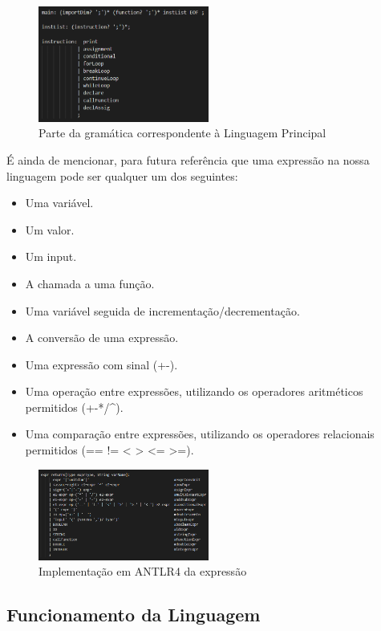 \documentclass[10pt,portuguese]{article}
\begin{document}
\begin{figure}[h]
\centering
\includegraphics[width=0.5\textwidth]{images/mainchubix.png}
\caption{Parte da gramática correspondente à Linguagem Principal}
\end{figure}

\par É ainda de mencionar, para futura referência que uma expressão na nossa linguagem pode ser qualquer um dos seguintes:
\begin{itemize}
    \item Uma variável.
	\item Um valor.
	\item Um input.
    \item A chamada a uma função.
	\item Uma variável seguida de incrementação/decrementação.
	\item A conversão de uma expressão.
	\item Uma expressão com sinal (+-).
	\item Uma operação entre expressões, utilizando os operadores aritméticos permitidos (+-*/\string^).
	\item Uma comparação entre expressões, utilizando os operadores relacionais permitidos (== != < > <= >=).
\end{itemize}
\begin{figure}[h]
\centering
\includegraphics[width=0.5\textwidth]{images/expr.png}
\caption{Implementação em ANTLR4 da expressão}
\end{figure}
\subsection{Funcionamento da Linguagem}
\end{document}
